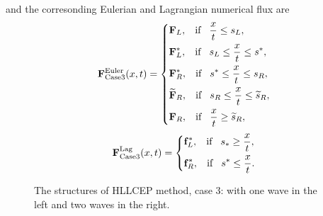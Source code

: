 \documentclass[review]{elsarticle}
\begin{document}
  and the corresonding Eulerian and Lagrangian numerical flux are
 \begin{equation}\label{eq:HLLCEP3}
   \mathbf{F}^{\text{Euler}}_{\text{Case3}}(x,t) = \left\{ \begin{aligned}
        & \mathbf{F}_L, \hspace{0.3cm} \text{if} \hspace{0.3cm} \frac{x}{t}\le s_L, \\
        & \mathbf{F}_L^*, \hspace{0.3cm} \text{if} \hspace{0.3cm} s_L\le \frac{x}{t} \le s^*, \\
        & \mathbf{F}_R^*, \hspace{0.3cm} \text{if} \hspace{0.3cm} s^*\le \frac{x}{t} \le s_R, \\
        &  \widetilde{\mathbf{F}}_R, \hspace{0.3cm} \text{if} \hspace{0.3cm} s_R\le \frac{x}{t} \le \widetilde{s}_R,\\
        & \mathbf{F}_R, \hspace{0.3cm} \text{if} \hspace{0.3cm} \frac{x}{t}\ge \widetilde{s}_R, \\
      \end{aligned}
    \right.
  \end{equation}
\begin{equation}
    \mathbf{F}^{\text{Lag}}_{\text{Case3}}(x,t) = \left\{ \begin{aligned}
        & \mathbf{f}_L^*, \hspace{0.3cm} \text{if} \hspace{0.3cm} s_*\ge \frac{x}{t},\\
        & \mathbf{f}_R^*, \hspace{0.3cm} \text{if} \hspace{0.3cm} s^*\le \frac{x}{t}.\\
      \end{aligned}
    \right.
  \end{equation}

\begin{figure}[ht]
  \centering
\caption{The  structures of HLLCEP method, case 3: with one wave in the left and two waves in  the right.}
\label{fig:case3}
\end{figure}
\end{document}
